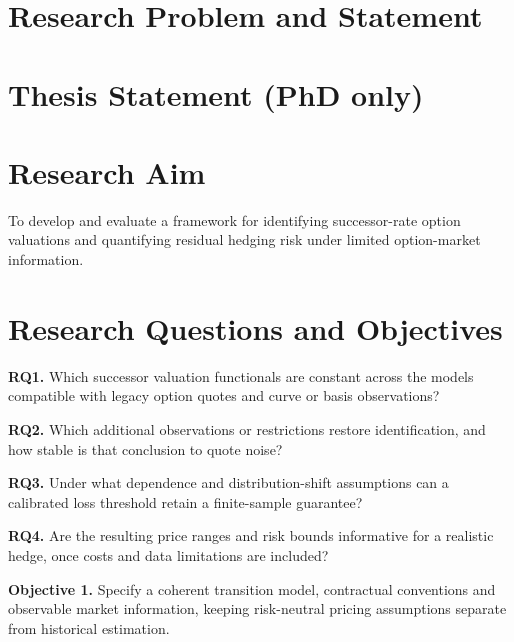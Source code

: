 \documentclass[12pt,final]{article}
\begin{document}
	\section{Research Problem and Statement} %

	\section{Thesis Statement (PhD only)} %

	\section{Research Aim} %

	To develop and evaluate a framework for identifying successor-rate option
	valuations and quantifying residual hedging risk under limited
	option-market information.

	\section{Research Questions and Objectives} %

	\textbf{RQ1.} Which successor valuation functionals are constant across the
	models compatible with legacy option quotes and curve or basis observations?

	\textbf{RQ2.} Which additional observations or restrictions restore
	identification, and how stable is that conclusion to quote noise?

	\textbf{RQ3.} Under what dependence and distribution-shift assumptions can a
	calibrated loss threshold retain a finite-sample guarantee?

	\textbf{RQ4.} Are the resulting price ranges and risk bounds informative for
	a realistic hedge, once costs and data limitations are included?

	\medskip
	\textbf{Objective 1.} Specify a coherent transition model, contractual
	conventions and observable market information, keeping risk-neutral pricing
	assumptions separate from historical estimation.
\end{document}
